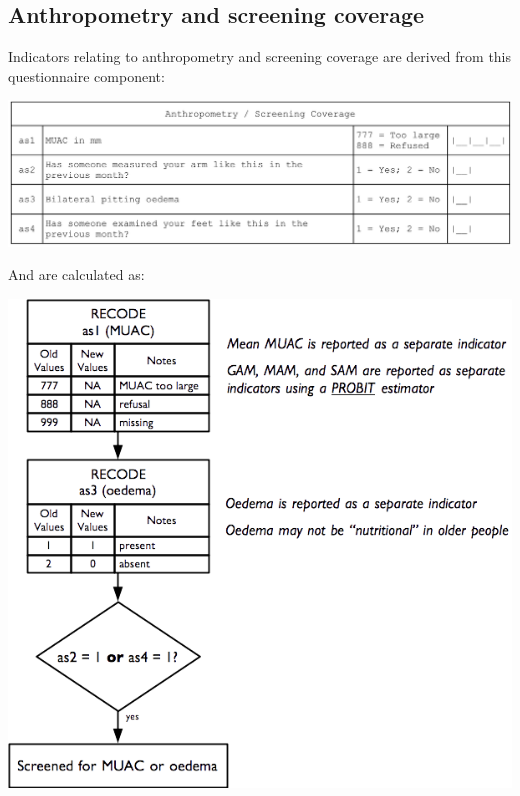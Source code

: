 \documentclass[12pt,a4paper]{book}
\theoremstyle{definition}
\theoremstyle{definition}
\theoremstyle{definition}
\theoremstyle{remark}
\begin{document}
\newpage

\hypertarget{anthropometry-and-screening-coverage}{%
\subsection{Anthropometry and screening
coverage}\label{anthropometry-and-screening-coverage}}

Indicators relating to anthropometry and screening coverage are derived
from this questionnaire component:

\begin{center}\includegraphics[width=23.86in]{figures/questionnaire11} \end{center}

And are calculated as:

\begin{center}\includegraphics[width=8.38in]{figures/indicators25} \end{center}
\end{document}
